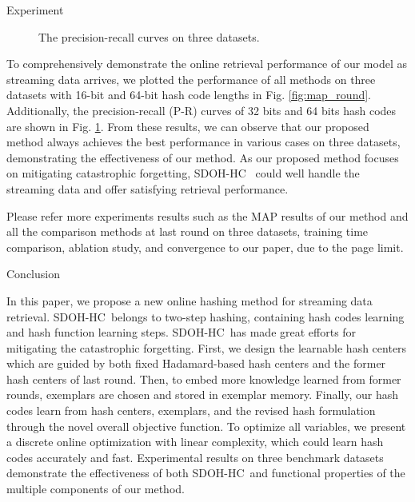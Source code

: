 \documentclass[final]{beamer}
\newlength{\colwidth}
\newcommand{\mymethodname}{SDOH-HC}
\begin{document}
\begin{frame}[t]
\begin{columns}[t]
\begin{column}{\colwidth}
\begin{block}{Experiment}
\begin{figure}
{							\label{fig_pr_m_64}} 
						\caption{The precision-recall curves on three datasets.}
						\label{fig:pr_curve}
					\end{figure}
					
					
 					To comprehensively demonstrate the online retrieval performance of our model as streaming data arrives, we plotted the performance of all methods on three datasets with 16-bit and 64-bit hash code lengths  in Fig. \ref{fig:map_round}. Additionally, the precision-recall (P-R) curves of 32 bits and 64 bits hash codes are shown in Fig. \ref{fig:pr_curve}. From these results, we can observe that our proposed method always achieves the best performance in various cases on three datasets, demonstrating the effectiveness of our method. As our proposed method focuses on mitigating catastrophic forgetting, \mymethodname~ could well handle the streaming data and offer satisfying retrieval performance.
 					
 					Please refer more experiments results such as the MAP results of our method and all the comparison methods at last round on three datasets, training time comparison, ablation study, and convergence to our paper, due to the page limit.

					
				\end{block}
				
				\begin{block}{Conclusion}
					
					In this paper, we propose a new online hashing method for streaming data retrieval. \mymethodname~belongs to two-step hashing, containing hash codes learning and hash function learning steps. \mymethodname~has made great efforts for mitigating the catastrophic forgetting. First, we design the learnable hash centers which are guided by both fixed Hadamard-based hash centers and the former hash centers of last round. Then, to embed more knowledge learned from former rounds, exemplars are chosen and stored in exemplar memory. Finally, our hash codes learn from hash centers, exemplars, and the revised hash formulation through the novel overall objective function. To optimize all variables, we present a discrete online optimization with linear complexity, which could learn hash codes accurately and fast. Experimental results on three benchmark datasets demonstrate the effectiveness of both \mymethodname~and functional properties of the multiple components of our method.
				\end{block}
				

\end{column}
\end{columns}
\end{frame}
\end{document}

